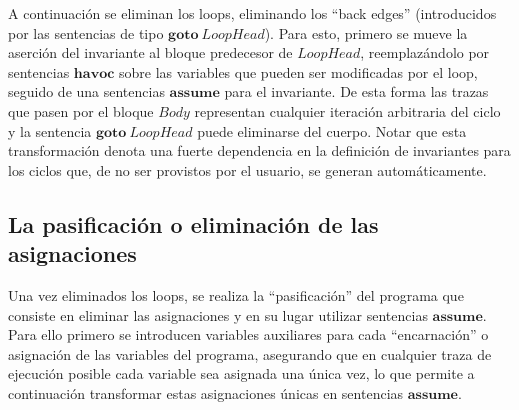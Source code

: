 \documentclass[12pt, a4paper, openany, fleqn]{book}
\begin{document}
    A continuación se eliminan los loops, eliminando los ``back edges'' (introducidos por las sentencias de tipo $\textbf{goto}\ LoopHead$). Para esto, primero se mueve la aserción del invariante al bloque predecesor de $LoopHead$, reemplazándolo por sentencias $\textbf{havoc}$ sobre las variables que pueden ser modificadas por el loop, seguido de una sentencias $\textbf{assume}$ para el invariante. De esta forma las trazas que pasen por el bloque $Body$ representan cualquier iteración arbitraria del ciclo y la sentencia $\textbf{goto}\ LoopHead$ puede eliminarse del cuerpo.
    Notar que esta transformación denota una fuerte dependencia en la definición de invariantes para los ciclos que, de no ser provistos por el usuario, se generan automáticamente.

    \subsection*{La pasificación o eliminación de las asignaciones}
    Una vez eliminados los loops, se realiza la ``pasificación'' del programa que consiste en eliminar las asignaciones y en su lugar utilizar sentencias $\textbf{assume}$. Para ello primero se introducen variables auxiliares para cada ``encarnación'' o asignación de las variables del programa, asegurando que en cualquier traza de ejecución posible cada variable sea asignada una única vez, lo que permite a continuación transformar estas asignaciones únicas en sentencias $\textbf{assume}$.
\end{document}
